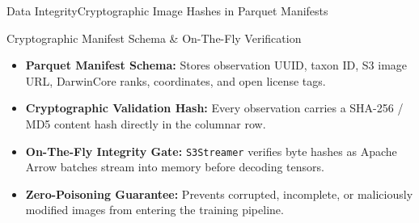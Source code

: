 \begin{frame}{Data Integrity}{Cryptographic Image Hashes in Parquet Manifests}
    \begin{block}{Cryptographic Manifest Schema \& On-The-Fly Verification}
        \begin{itemize}\small
            \item \textbf{Parquet Manifest Schema:} Stores observation UUID, taxon ID, S3 image URL, DarwinCore ranks, coordinates, and open license tags.
            \item \textbf{Cryptographic Validation Hash:} Every observation carries a SHA-256 / MD5 content hash directly in the columnar row.
            \item \textbf{On-The-Fly Integrity Gate:} \texttt{S3Streamer} verifies byte hashes as Apache Arrow batches stream into memory before decoding tensors.
            \item \textbf{Zero-Poisoning Guarantee:} Prevents corrupted, incomplete, or maliciously modified images from entering the training pipeline.
        \end{itemize}
    \end{block}

    \vspace{0.1cm}
    \statusdone

\end{frame}


